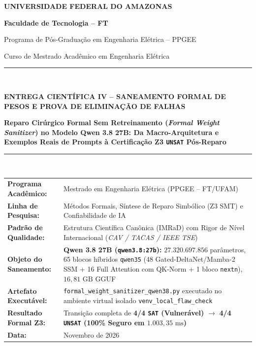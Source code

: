 \documentclass[11pt,a4paper]{article}
\theoremstyle{definition}
\begin{document}
\begin{titlepage}
    \centering
    \vspace*{0.25cm}
    {\Huge\bfseries\color{ufamblue} UNIVERSIDADE FEDERAL DO AMAZONAS \par}
    \vspace{0.2cm}
    {\Large\bfseries Faculdade de Tecnologia -- FT \par}
    {\large Programa de Pós-Graduação em Engenharia Elétrica -- PPGEE \par}
    {\normalsize Curso de Mestrado Acadêmico em Engenharia Elétrica \par}
    \vspace{0.75cm}
    
    \rule{\linewidth}{1.5pt} \\[0.35cm]
    {\large\bfseries ENTREGA CIENTÍFICA IV -- SANEAMENTO FORMAL DE PESOS E PROVA DE ELIMINAÇÃO DE FALHAS \par}
    \vspace{0.25cm}
    {\LARGE\bfseries Reparo Cirúrgico Formal Sem Retreinamento (\textit{Formal Weight Sanitizer}) no Modelo Qwen 3.8 27B: Da Macro-Arquitetura e Exemplos Reais de Prompts à Certificação Z3 \texttt{UNSAT} Pós-Reparo \par}
    \rule{\linewidth}{1.5pt} \\[0.65cm]
    
    \begin{minipage}{0.98\textwidth}
        \small
        \begin{tabularx}{\linewidth}{l X}
            \textbf{Programa Acadêmico:} & Mestrado em Engenharia Elétrica (PPGEE -- FT/UFAM) \\
            \textbf{Linha de Pesquisa:} & Métodos Formais, Síntese de Reparo Simbólico (Z3 SMT) e Confiabilidade de IA \\
            \textbf{Padrão de Qualidade:} & Estrutura Científica Canônica (IMRaD) com Rigor de Nível Internacional (\textit{CAV / TACAS / IEEE TSE}) \\
            \textbf{Objeto do Saneamento:} & \textbf{Qwen 3.8 27B (\texttt{qwen3.8:27b}):} $27.320.697.856$ parâmetros, 65 blocos híbridos \texttt{qwen35} (48 Gated-DeltaNet/Mamba-2 SSM + 16 Full Attention com QK-Norm + 1 bloco \texttt{nextn}), $16{,}81\text{ GB}$ GGUF \\
            \textbf{Artefato Executável:} & \texttt{formal\_weight\_sanitizer\_qwen38.py} executado no ambiente virtual isolado \texttt{venv\_local\_flaw\_check} \\
            \textbf{Resultado Formal Z3:} & Transição completa de \textbf{4/4 \texttt{SAT} (Vulnerável)} $\longrightarrow$ \textbf{4/4 \texttt{UNSAT} (100\% Seguro em $1.003{,}35\text{ ms}$)} \\
            \textbf{Data:} & Novembro de 2026
        \end{tabularx}
    \end{minipage}
    

\end{titlepage}
\end{document}
